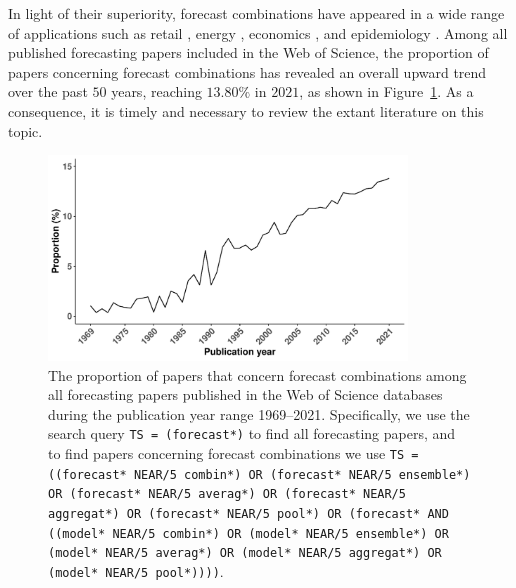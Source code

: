\documentclass[11pt]{article}
\begin{document}
In light of their superiority, forecast combinations have appeared in a wide range of applications such as retail \citep{Ma2021-np}, energy \citep{Xie2016-fb}, economics \citep{Aastveit2018-lf}, and epidemiology \citep{Brooks2020-sg}. Among all published forecasting papers included in the Web of Science, the proportion of papers concerning forecast combinations has revealed an overall upward trend over the past $50$ years, reaching $13.80\%$ in $2021$, as shown in Figure~\ref{fig:prop}. As a consequence, it is timely and necessary to review the extant literature on this topic.

\begin{figure}[!htb]
  \centering \includegraphics[width=0.85\textwidth]{prop}
  \caption{The proportion of papers that concern forecast combinations among all forecasting papers published in the Web of Science databases during the publication year range 1969--2021. Specifically, we use the search query \texttt{TS = (forecast*)} to find all forecasting papers, and to find papers concerning forecast combinations we use \texttt{TS = ((forecast* NEAR/5 combin*) OR (forecast* NEAR/5 ensemble*) OR (forecast* NEAR/5 averag*) OR (forecast* NEAR/5 aggregat*) OR (forecast* NEAR/5 pool*) OR (forecast* AND ((model* NEAR/5 combin*) OR (model* NEAR/5 ensemble*) OR (model* NEAR/5 averag*) OR (model* NEAR/5 aggregat*) OR (model* NEAR/5 pool*))))}.}
  \label{fig:prop}
\end{figure}
\end{document}
